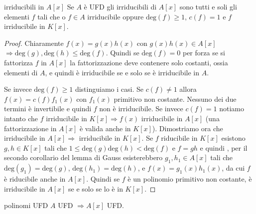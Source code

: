 \begin{theorem}{irriducibili in $A[x]$}
    Se $A$ è UFD gli irriducibili di $A[x]$ sono tutti e soli gli elementi $f$ tali che o $f \in A$ irriducibile oppure $\text{deg}(f) \geq 1$, $c(f) = 1$ e $f$ irriducibile in $K[x]$.
\end{theorem}
\begin{proof}
    Chiaramente $f(x) = g(x)h(x)$ con $g(x)h(x) \in A[x]$ $\Rightarrow \text{deg}(g),\text{deg}(h) \leq \text{deg}(f)$.
    Quindi se $\text{deg}(f) = 0$ per forza se si fattorizza $f$ in $A[x]$ la fattorizzazione deve contenere solo costanti, ossia elementi di $A$, e quindi è irriducibile se e solo se è irriducibile in $A$.
    
    Se invece $\text{deg}(f) \geq 1$ distinguiamo i casi. Se $c(f) \neq 1$ allora $f(x) = c(f)f_1(x)$ con $f_1(x)$ primitivo non costante. Nessuno dei due termini è invertibile e quindi $f$ non è irriducibile. Se invece $c(f) = 1$ notiamo intanto che $f$ irriducibile in $K[x] \Rightarrow f(x)$ irriducibile in $A[x]$ (una fattorizzazione in $A[x]$ è valida anche in $K[x]$). Dimostriamo ora che irriducibile in $A[x] \Rightarrow$ irriducibile in $K[x]$. Se $f$ riducibile in $K[x]$ esistono $g,h \in K[x]$ tali che $1 \leq \text{deg}(g)\text{deg}(h) < \text{deg}(f)$ e $f = gh$ e quindi , per il secondo corollario del lemma di Gauss esisterebbero $g_1,h_1 \in A[x]$ tali che $\text{deg}(g_1) = \text{deg}(g)$, $\text{deg}(h_1) = \text{deg}(h)$, e $f(x) = g_1(x)h_1(x)$, da cui $f$ è riducibile anche in $A[x]$. Quindi se $f$ è un polinomio primitivo non costante, è irriducibile in $A[x]$ se e solo se lo è in $K[x]$. 
\end{proof}
\begin{theorem}{polinomi UFD}
    $A$ UFD $\Rightarrow A[x]$ UFD.
\end{theorem}
